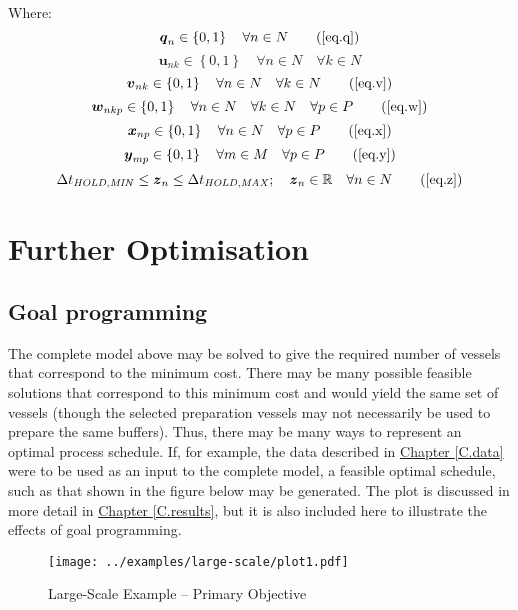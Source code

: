 Where:
\begin{equation}
    \boldsymbol{q}_{n} \in \left\{ 0, 1 \right\} \quad \forall n \in N
    \tag{\ref{eq.q}}
\end{equation}
\begin{equation}
    \boldsymbol{u}_{nk} \in \left\{ 0, 1 \right\} \quad \forall n \in N \quad
    \forall k \in N
    \label{eq.u}
\end{equation}
\begin{equation}
    \boldsymbol{v}_{nk} \in \left\{ 0, 1 \right\} \quad \forall n \in N \quad
    \forall k \in N
    \tag{\ref{eq.v}}
\end{equation}
\begin{equation}
    \boldsymbol{w}_{nkp} \in \left\{ 0, 1 \right\} \quad \forall n \in N \quad
    \forall k \in N \quad \forall p \in P
    \tag{\ref{eq.w}}
\end{equation}
\begin{equation}
    \boldsymbol{x}_{np} \in \left\{ 0, 1 \right\} \quad \forall n \in N \quad
    \forall p \in P
    \tag{\ref{eq.x}}
\end{equation}
\begin{equation}
    \boldsymbol{y}_{mp} \in \left\{ 0, 1 \right\} \quad \forall m \in M \quad
    \forall p \in P
    \tag{\ref{eq.y}}
\end{equation}
\begin{equation}
    \Delta t_{\mathit{HOLD,MIN}} \le \boldsymbol{z}_{n} \le \Delta
    t_{\mathit{HOLD,MAX}}; \quad \boldsymbol{z}_{n} \in \mathbb{R} \quad
    \forall n \in N
    \tag{\ref{eq.z}}
\end{equation}

\section{Further Optimisation}\label{S.implementation}

\subsection{Goal programming}\label{SS.goal}
The complete model above may be solved to give the required number of vessels
that correspond to the minimum cost.
There may be many possible feasible solutions that correspond to this minimum
cost and would yield the same set of vessels (though the selected preparation
vessels may not necessarily be used to prepare the same buffers).
Thus, there may be many ways to represent an optimal process schedule.
If, for example, the data described in
\hyperref[C.data]{Chapter \ref*{C.data}} were to be used as an input to the
complete model, a feasible optimal schedule, such as that shown in the figure
below may be generated.
The plot is discussed in more detail in
\hyperref[C.results]{Chapter \ref*{C.results}}, but it is also included here to
illustrate the effects of goal programming.
\begin{figure}
    \centering
    \texttt{[image: ../examples/large-scale/plot1.pdf]}
    \caption{Large-Scale Example -- Primary Objective}
    \label{fig.primary}
\end{figure}

